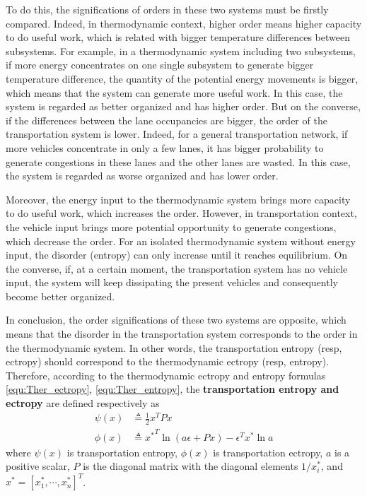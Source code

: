 \documentclass[trsc,nonblindrev]{informs3} %
\renewcommand{\vec}[1]{#1}
\newcommand{\mat}[1]{#1}
\begin{document}
To do this, the significations of orders in these two systems must be
firstly compared. Indeed, in thermodynamic context, higher order
means higher capacity to do useful work, which is related with bigger
temperature differences between subsystems. For example, in a
thermodynamic system including two subsystems, if more energy
concentrates on one single subsystem to generate bigger temperature
difference, the quantity of the potential energy movements is bigger,
which means that the system can generate more useful work. In this
case, the system is regarded as better organized and has higher
order. But on the converse, if the differences between the lane
occupancies are bigger, the order of the transportation system is
lower. Indeed, for a general transportation network, if more vehicles
concentrate in only a few lanes, it has bigger probability to
generate congestions in these lanes and the other lanes are wasted.
In this case, the system is regarded as worse organized and has lower
order.

Moreover, the energy input to the thermodynamic system brings more
capacity to do useful work, which increases the order. However, in
transportation context, the vehicle input brings more potential
opportunity to generate congestions, which decrease the order. For an
isolated thermodynamic system without energy input, the disorder
(entropy) can only increase until it reaches equilibrium. On the
converse, if, at a certain moment, the transportation system has no
vehicle input, the system will keep dissipating the present vehicles
and consequently become better organized.

In conclusion, the order significations of these two systems are
opposite, which means that the disorder in the transportation system
corresponds to the order in the thermodynamic system. In other words,
the transportation entropy (resp, ectropy) should correspond to the
thermodynamic ectropy (resp, entropy). Therefore, according to the
thermodynamic ectropy and entropy formulas \eqref{equ:Ther_ectropy},
\eqref{equ:Ther_entropy}, the \textbf{transportation entropy and
ectropy} are defined respectively as
\begin{align}
\label{equ:Tran_entropy}
\psi(\vec{x}) &\triangleq \frac{1}{2}\vec{x}^T \mat{P} \vec{x}\\
\phi(\vec{x}) &\triangleq{\vec{x}^*}^T \ln
(a\vec{\epsilon}+\mat{P}\vec{x}) -\vec{\epsilon}^T\vec{x}^*\ln a
\label{equ:Tran_ectropy}
\end{align}
where $\psi(\vec{x})$ is transportation entropy, $\phi(\vec{x})$ is
transportation ectropy, $a$ is a positive scalar, $\mat{P}$ is the
diagonal matrix with the diagonal elements $1/x_i^*$, and
$\vec{x}^*=[x_1^*,\cdots,x_n^*]^T$.
\end{document}
